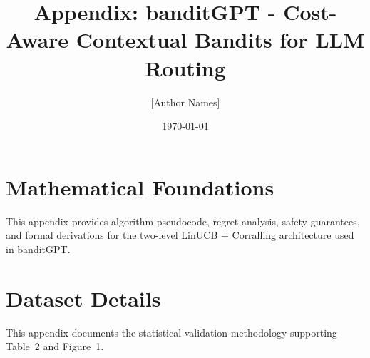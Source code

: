 \documentclass[10pt,letterpaper]{article}
\title{Appendix: banditGPT - Cost-Aware Contextual Bandits for LLM Routing}
\author{[Author Names]}
\date{\today}
\begin{document}
\ifx\appendixstandalone\undefined
\else
  \maketitle
  \tableofcontents
  \newpage
\fi


\appendix
\section{Mathematical Foundations}
\label{appendix:mathematical_foundations}

This appendix provides algorithm pseudocode, regret analysis, safety guarantees,
and formal derivations for the two-level LinUCB + Corralling architecture used
in banditGPT.










\section{Dataset Details}
\label{appendix:dataset_details}

This appendix documents the statistical validation methodology supporting Table~2 and Figure~1.




\end{document}
